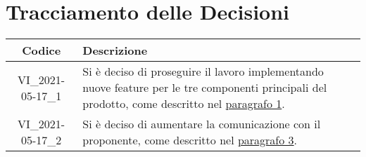 \section*{Tracciamento delle Decisioni}

\begin{center}
	\begin{longtable}{|c|p{13cm}|}
	\hline
	\rowcolor{lighter-grayer}
	\textbf{Codice} & \textbf{Descrizione} \\
	\hline
	\endfirsthead

	
	
	VI\_2021-05-17\_1 & Si è deciso di proseguire il lavoro implementando nuove feature per le tre componenti principali del prodotto, come descritto nel \hyperlink{link1}{paragrafo 1}.  \\
	\hline
	VI\_2021-05-17\_2 & Si è deciso di aumentare la comunicazione con il proponente, come descritto nel \hyperlink{link3}{paragrafo 3}. \\
	\hline

	

	\end{longtable}
\end{center}

